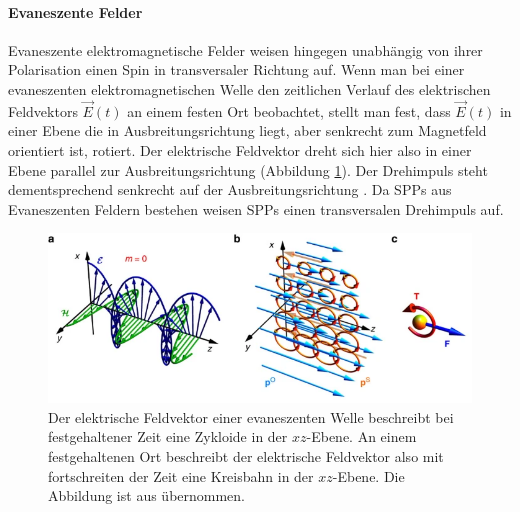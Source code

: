 \documentclass[titlepage,  ngerman]{article}
\begin{document}
	\paragraph{Evaneszente Felder}	
	Evaneszente elektromagnetische Felder weisen hingegen unabhängig von ihrer Polarisation einen Spin in transversaler Richtung auf. Wenn man bei einer evaneszenten elektromagnetischen Welle den zeitlichen Verlauf des elektrischen Feldvektors $\vec{E}(t)$ an einem festen Ort beobachtet, stellt man fest, dass $\vec{E}(t)$ in einer Ebene die in Ausbreitungsrichtung liegt, aber senkrecht zum Magnetfeld orientiert ist, rotiert. Der elektrische Feldvektor dreht sich hier also in einer Ebene parallel zur Ausbreitungsrichtung (Abbildung \ref{fig:ev_spin}). Der Drehimpuls steht dementsprechend senkrecht auf der Ausbreitungsrichtung \cite{Bliokh.2014}. Da SPPs aus Evaneszenten Feldern bestehen weisen SPPs einen transversalen Drehimpuls auf. 
	
	\begin{figure}[h]
		\centering
		\includegraphics[width=0.7\linewidth]{figures/spin/ev_spin}
		\caption[Spin evaneszente EM-Welle]{Der elektrische Feldvektor einer evaneszenten Welle beschreibt bei festgehaltener Zeit eine Zykloide in der $xz$-Ebene. An einem festgehaltenen Ort beschreibt der elektrische Feldvektor also mit fortschreiten der Zeit eine Kreisbahn in der $xz$-Ebene. Die Abbildung ist aus \cite{Bliokh.2014} übernommen.}
		\label{fig:ev_spin}
	\end{figure}
\end{document}
